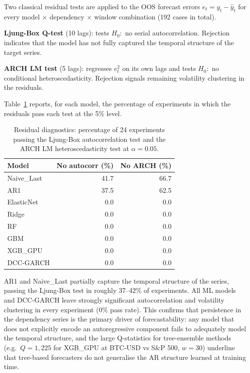 Two classical residual tests are applied to the OOS forecast errors
$e_t = y_t - \hat{y}_t$ for every model $\times$ dependency $\times$ window
combination (192 cases in total).

\textbf{Ljung-Box Q-test} (10 lags): tests $H_0{:}$ no serial autocorrelation.
Rejection indicates that the model has not fully captured the temporal structure
of the target series.

\textbf{ARCH LM test} (5 lags): regresses $e_t^2$ on its own lags and tests
$H_0{:}$ no conditional heteroscedasticity.
Rejection signals remaining volatility clustering in the residuals.

Table~\ref{tab:resid_summary} reports, for each model, the percentage of
experiments in which the residuals pass each test at the 5\% level.

\begin{table}[H]
    \centering
    \caption{Residual diagnostics: percentage of 24 experiments passing the
             Ljung-Box autocorrelation test and the ARCH LM heteroscedasticity
             test at $\alpha = 0.05$.}
    \label{tab:resid_summary}
    \begin{tabular}{lrr}
        \toprule
        Model & No autocorr (\%) & No ARCH (\%) \\
        \midrule
        Naive\_Last &  41.7 & 66.7 \\
        AR1         &  37.5 & 62.5 \\
        ElasticNet  &   0.0 &  0.0 \\
        Ridge       &   0.0 &  0.0 \\
        RF          &   0.0 &  0.0 \\
        GBM         &   0.0 &  0.0 \\
        XGB\_GPU    &   0.0 &  0.0 \\
        DCC-GARCH   &   0.0 &  0.0 \\
        \bottomrule
    \end{tabular}
\end{table}

AR1 and Naive\_Last partially capture the temporal structure of the series,
passing the Ljung-Box test in roughly 37--42\% of experiments.
All ML models and DCC-GARCH leave strongly significant autocorrelation and
volatility clustering in every experiment (0\% pass rate).
This confirms that persistence in the dependency series is the primary
driver of forecastability: any model that does not explicitly encode an
autoregressive component fails to adequately model the temporal structure,
and the large Q-statistics for tree-ensemble methods (e.g.\
$Q = 1{,}225$ for XGB\_GPU at BTC-USD vs S\&P 500, $w = 30$)
underline that tree-based forecasters do not generalise the AR structure
learned at training time.

